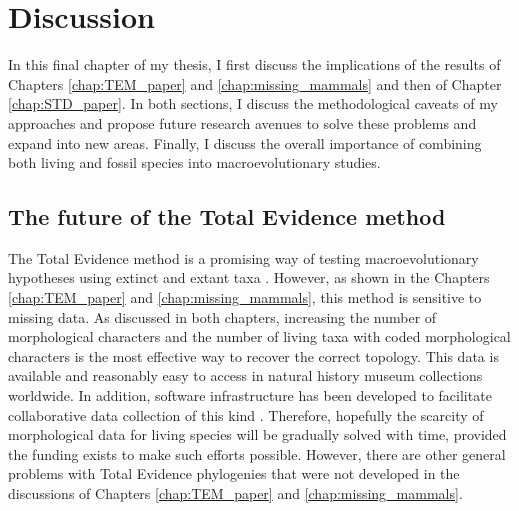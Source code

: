 \chapter{Discussion}
\label{chap:discussion}

%
%

In this final chapter of my thesis, I first discuss the implications of the results of Chapters \ref{chap:TEM_paper} and \ref{chap:missing_mammals} and then of Chapter \ref{chap:STD_paper}.
In both sections, I discuss the methodological caveats of my approaches and propose future research avenues to solve these problems and expand into new areas.
Finally, I discuss the overall importance of combining both living and fossil species into macroevolutionary studies.

\section{The future of the Total Evidence method}
The Total Evidence method is a promising way of testing macroevolutionary hypotheses using extinct and extant taxa \citep[e.g.][]{ronquista2012,Slater2012MEE,Wood01032013,beckancient2014,Dembo2015}.
However, as shown in the Chapters \ref{chap:TEM_paper} and \ref{chap:missing_mammals}, this method is sensitive to missing data.
As discussed in both chapters, increasing the number of morphological characters and the number of living taxa with coded morphological characters is the most effective way to recover the correct topology.
This data is available and reasonably easy to access in natural history museum collections worldwide. 
In addition, software infrastructure has been developed to facilitate collaborative data collection of this kind \citep[\textit{MorphoBank};][]{morphobank}.
Therefore, hopefully the scarcity of morphological data for living species will be gradually solved with time, provided the funding exists to make such efforts possible.
However, there are other general problems with Total Evidence phylogenies that were not developed in the discussions of Chapters \ref{chap:TEM_paper} and \ref{chap:missing_mammals}. 

